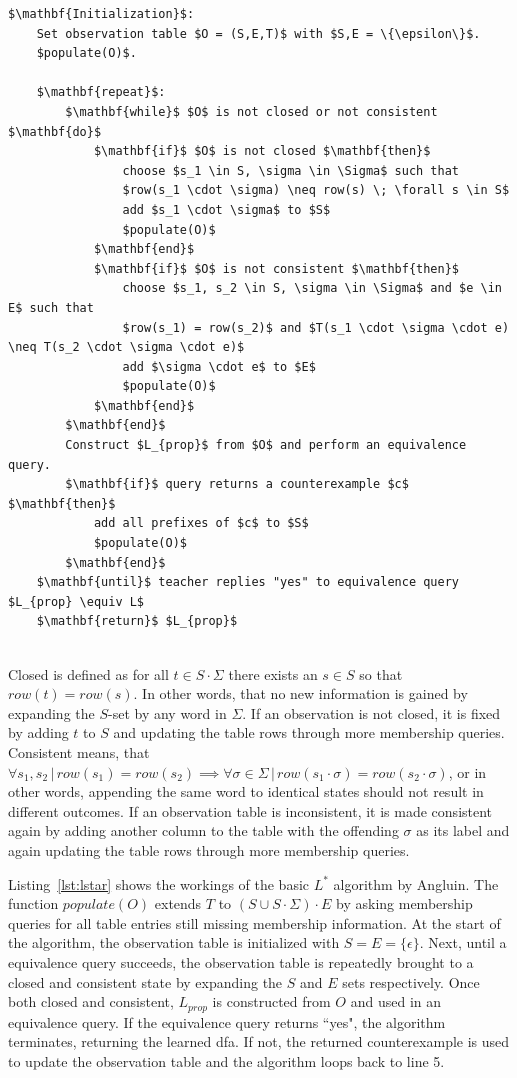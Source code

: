 \begin{lstlisting}[mathescape=true, float=b, caption=$L^*$ algorithm, label=lst:lstar]
	$\mathbf{Initialization}$: 
	Set observation table $O = (S,E,T)$ with $S,E = \{\epsilon\}$.
	$populate(O)$.
	
	$\mathbf{repeat}$:
		$\mathbf{while}$ $O$ is not closed or not consistent $\mathbf{do}$
			$\mathbf{if}$ $O$ is not closed $\mathbf{then}$
				choose $s_1 \in S, \sigma \in \Sigma$ such that
				$row(s_1 \cdot \sigma) \neq row(s) \; \forall s \in S$
				add $s_1 \cdot \sigma$ to $S$
				$populate(O)$
			$\mathbf{end}$
			$\mathbf{if}$ $O$ is not consistent $\mathbf{then}$
				choose $s_1, s_2 \in S, \sigma \in \Sigma$ and $e \in E$ such that
				$row(s_1) = row(s_2)$ and $T(s_1 \cdot \sigma \cdot e) \neq T(s_2 \cdot \sigma \cdot e)$
				add $\sigma \cdot e$ to $E$
				$populate(O)$
			$\mathbf{end}$		
		$\mathbf{end}$
		Construct $L_{prop}$ from $O$ and perform an equivalence query.	
		$\mathbf{if}$ query returns a counterexample $c$ $\mathbf{then}$
			add all prefixes of $c$ to $S$
			$populate(O)$
		$\mathbf{end}$
	$\mathbf{until}$ teacher replies "yes" to equivalence query $L_{prop} \equiv L$
	$\mathbf{return}$ $L_{prop}$
		
\end{lstlisting}

Closed is defined as for all $t \in S \cdot \Sigma$ there exists an $s \in S$ so that $row(t) = row(s)$. In other words, that no new information is gained by expanding the $S$-set by any word in $\Sigma$. If an observation is not closed, it is fixed by adding $t$ to $S$ and updating the table rows through more membership queries. 
Consistent means, that $\forall s_1, s_2 \,|\, row(s_1) = row(s_2) \implies \forall \sigma \in \Sigma \,|\, row(s_1 \cdot \sigma) = row(s_2 \cdot \sigma)$, or in other words, appending the same word to identical states should not result in different outcomes. If an observation table is inconsistent, it is made consistent again by adding another column to the table with the offending $\sigma$ as its label and again updating the table rows through more membership queries. 

Listing~\ref{lst:lstar} shows the workings of the basic $L^*$ algorithm by Angluin. The function $populate(O)$ extends $T$ to $(S \cup S \cdot \Sigma) \cdot E$ by asking membership queries for all table entries still missing membership information. At the start of the algorithm, the observation table is initialized with $S = E = \{\epsilon\}$. Next, until a equivalence query succeeds, the observation table is repeatedly brought to a closed and consistent state by expanding the $S$ and $E$ sets respectively. Once both closed and consistent, $L_{prop}$ is constructed from $O$ and used in an equivalence query. If the equivalence query returns ``yes", the algorithm terminates, returning the learned \ac{dfa}. If not, the returned counterexample is used to update the observation table and the algorithm loops back to line 5. 


